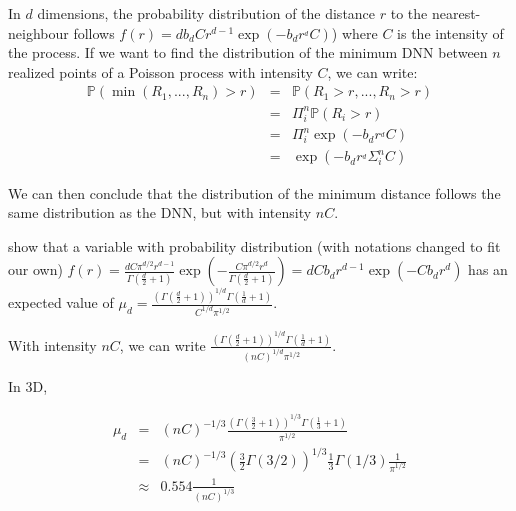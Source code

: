 \documentclass[english]{article}
\begin{document}
\begin{doublespace}
In $d$ dimensions, the probability distribution of the distance $r$
to the nearest-neighbour follows $f(r)=db_{d}Cr^{d-1}\exp(-b_{d}r^{_{d}}C)$)
where $C$ is the intensity of the process. If we want to find the
distribution of the minimum DNN between $n$ realized points of a
Poisson process with intensity $C$, we can write:
\begin{equation}
\begin{array}{ccc}
\mathbb{P}(\min(R_{1},...,R_{n})>r) & = & \mathbb{P}(R_{1}>r,...,R_{n}>r)\\
 & = & \Pi_{i}^{n}\mathbb{P}(R_{i}>r)\\
 & = & \Pi_{i}^{n}\exp(-b_{d}r^{_{d}}C)\\
 & = & \exp(-b_{d}r^{_{d}}\Sigma_{i}^{n}C)
\end{array}
\end{equation}

\end{doublespace}

We can then conclude that the distribution of the minimum distance
follows the same distribution as the DNN, but with intensity $nC$.

\medskip{}

\citet{clark_generalization_1979} show that a variable with probability
distribution (with notations changed to fit our own) $f(r)=\frac{dC\pi^{d/2}r^{d-1}}{\Gamma(\frac{d}{2}+1)}\exp(-\frac{C\pi^{d/2}r^{d}}{\Gamma(\frac{d}{2}+1)})=dCb_{d}r^{d-1}\exp(-Cb_{d}r^{d})$
has an expected value of $\mu_{d}=\frac{\left(\Gamma(\frac{d}{2}+1)\right)^{1/d}\Gamma(\frac{1}{d}+1)}{C^{1/d}\pi^{1/2}}$.

With intensity $nC$, we can write $\frac{\left(\Gamma(\frac{d}{2}+1)\right)^{1/d}\Gamma(\frac{1}{d}+1)}{(nC)^{1/d}\pi^{1/2}}$.

\medskip{}

In 3D, 

\begin{doublespace}
\begin{equation}
\begin{array}{ccc}
\mu_{d} & = & (nC)^{-1/3}\frac{\left(\Gamma(\frac{3}{2}+1)\right)^{1/3}\Gamma(\frac{1}{3}+1)}{\pi^{1/2}}\\
 & = & (nC)^{-1/3}\left(\frac{3}{2}\Gamma(3/2)\right)^{1/3}\frac{1}{3}\Gamma(1/3)\frac{1}{\pi^{1/2}}\\
 & \approx & 0.554\frac{1}{(nC)^{1/3}}
\end{array}\label{eq:dnn_realization}
\end{equation}

\end{doublespace}
\end{document}
